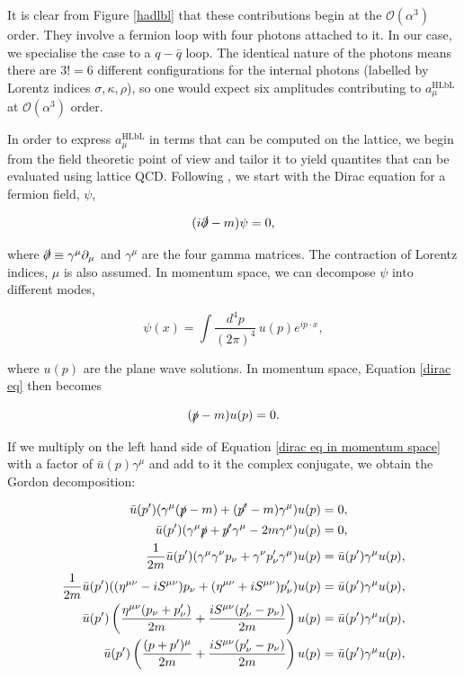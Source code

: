 \documentclass{article}
\numberwithin{equation}{section} %
\begin{document}
It is clear from Figure \ref{hadlbl} that these contributions begin at the $\mathcal{O}(\alpha^3)$ order. They involve a fermion loop with four photons attached to it\cite{lehnerg2}. In our case, we specialise the case to a $q-\bar{q}$ loop. The identical nature of the photons means there are $3!=6$ different configurations for the internal photons (labelled by Lorentz indices $\sigma, \kappa, \rho$), so one would expect six amplitudes contributing to $a_\mu^\mathrm{HLbL}$ at $\mathcal{O}(\alpha^3)$ order.

In order to express $a_\mu^\mathrm{HLbL}$ in terms that can be computed on the lattice, we begin from the field theoretic point of view and tailor it to yield quantites that can be evaluated using lattice QCD. Following \cite{zee}, we start with the Dirac equation for a fermion field, $\psi$,

\begin{equation}
(i\slashed{\partial} -m)\psi=0,
\label{dirac eq}
\end{equation}

\noindent where $\slashed{\partial} \equiv \gamma^\mu\partial_\mu$ and $\gamma^\mu$ are the four gamma matrices. The contraction of Lorentz indices, $\mu$ is also assumed. In momentum space, we can decompose $\psi$ into different modes,

\begin{equation}
\psi(x) = \int \frac{d^4p}{(2\pi)^4} \, u(p) e^{ip\cdot x},
\end{equation}

\noindent where $u(p)$ are the plane wave solutions\cite{tong}. In momentum space, Equation \ref{dirac eq} then becomes

\begin{equation}
(\slashed{p} - m)u(p) = 0.
\label{dirac eq in momentum space}
\end{equation}

\noindent If we multiply on the left hand side of Equation \ref{dirac eq in momentum space} with a factor of $\bar{u}(p)\gamma^\mu$ and add to it the complex conjugate, we obtain the Gordon decomposition:

\begin{equation}
\begin{split}
\bar{u}(p')(\gamma^\mu(\slashed{p}-m) + (\slashed{p'}-m)\gamma^\mu)u(p) &= 0,\\
\bar{u}(p')(\gamma^\mu\slashed{p} + \slashed{p'}\gamma^\mu- 2m\gamma^\mu)u(p) &= 0,\\
\frac{1}{2m}\bar{u}(p')(\gamma^\mu\gamma^\nu p_\nu + \gamma^\nu p'_\nu\gamma^\mu)u(p) &= \bar{u}(p')\gamma^\mu u(p),\\
\frac{1}{2m}\bar{u}(p')( (\eta^{\mu\nu} - iS^{\mu\nu})p_\nu + (\eta^{\mu\nu} + iS^{\mu\nu}) p'_\nu)u(p) &= \bar{u}(p')\gamma^\mu u(p),\\
\bar{u}(p')\left( \frac{\eta^{\mu\nu}(p_\nu + p'_\nu)}{2m} + \frac{iS^{\mu\nu}(p'_\nu - p_\nu)}{2m} \right)u(p) &= \bar{u}(p')\gamma^\mu u(p),\\
\bar{u}(p')\left( \frac{(p + p')^\mu}{2m} + \frac{iS^{\mu\nu}(p'_\nu - p_\nu)}{2m} \right)u(p) &= \bar{u}(p')\gamma^\mu u(p),
\end{split}
\label{gordon decomposition}
\end{equation}
\end{document}
